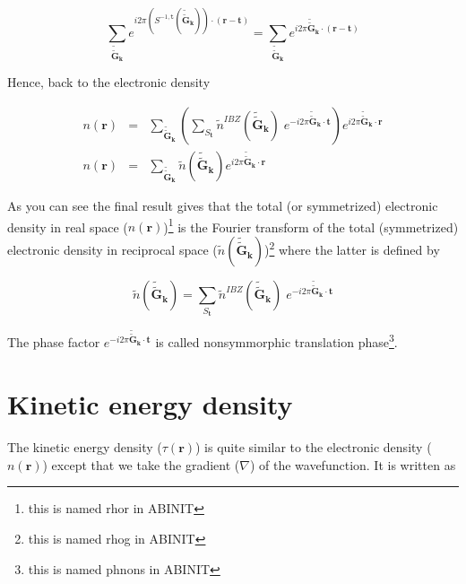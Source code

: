 \documentclass[a4paper,12pt]{report}
\begin{document}
\begin{equation}
\sum_{\tilde{\tilde{\mathbf{G}}}_{\mathbf{k}}} e^{i2\pi \left( S^{-1,{\mathtt{t}}} (\tilde{\tilde{\mathbf{G}}}_{\mathbf{k}}) \right) \cdot (\mathbf{r}-\mathbf{t}) } = \sum_{\tilde{\tilde{\mathbf{G}}}_{\mathbf{k}}} e^{i2\pi \tilde{\tilde{\mathbf{G}}}_{\mathbf{k}} \cdot (\mathbf{r}-\mathbf{t}) } \label{trick_tildetildeGk}
\end{equation}

Hence, back to the electronic density

\begin{eqnarray}
n(\mathbf{r}) &=& \sum_{\tilde{\tilde{\mathbf{G}}}_{\mathbf{k}}} \left( \sum_{S_{\mathbf{t}}} \tilde{n}^{IBZ}(\tilde{\tilde{\mathbf{G}}}_{\mathbf{k}})\; e^{-i2\pi \tilde{\tilde{\mathbf{G}}}_{\mathbf{k}} \cdot \mathbf{t}} \right) e^{i2\pi \tilde{\tilde{\mathbf{G}}}_{\mathbf{k}} \cdot \mathbf{r} } \nonumber \\
n(\mathbf{r}) &=& \sum_{\tilde{\tilde{\mathbf{G}}}_{\mathbf{k}}} \tilde{n}(\tilde{\tilde{\mathbf{G}}}_{\mathbf{k}}) e^{i2\pi \tilde{\tilde{\mathbf{G}}}_{\mathbf{k}} \cdot \mathbf{r} } \label{Eqntot_FFT}
\end{eqnarray}

As you can see the final result gives that the total (or symmetrized) electronic density in real space ($n(\mathbf{r})$)\footnote{this is named rhor in ABINIT} is the Fourier transform of the total (symmetrized) electronic density in reciprocal space ($\tilde{n}(\tilde{\tilde{\mathbf{G}}}_{\mathbf{k}})$)\footnote{this is named rhog in ABINIT} where the latter is defined by

\begin{equation}
\tilde{n}(\tilde{\tilde{\mathbf{G}}}_{\mathbf{k}}) = \sum_{S_{\mathbf{t}}} \tilde{n}^{IBZ}(\tilde{\tilde{\mathbf{G}}}_{\mathbf{k}})\; e^{-i2\pi \tilde{\tilde{\mathbf{G}}}_{\mathbf{k}} \cdot \mathbf{t}}
\end{equation}

The phase factor $e^{-i2\pi \tilde{\tilde{\mathbf{G}}}_{\mathbf{k}} \cdot \mathbf{t}}$ is called nonsymmorphic translation phase\footnote{this is named phnons in ABINIT}.

\section{Kinetic energy density}
\label{section2_2}

The kinetic energy density ($\tau(\mathbf{r})$) is quite similar to the electronic density ($n(\mathbf{r})$) except that we take the gradient ($\nabla$) of the wavefunction. It is written as
\end{document}
